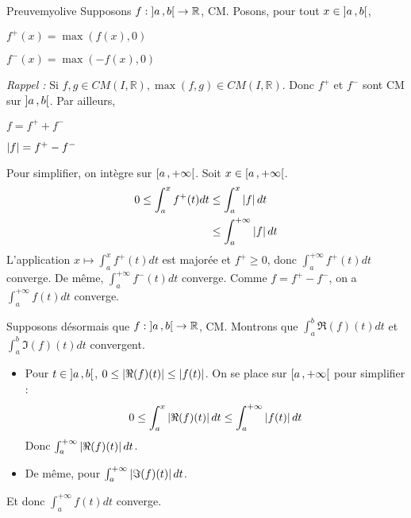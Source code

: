     \begin{demo}{Preuve}{myolive}
        Supposons $f : \left] a \, , b \right[ \to \mathbb{R}$, CM. Posons, pour tout $x \in \left] a \, , b \right[$, 
        \begin{itemize}
            \begin{multicols}{2}
            \item $f^+(x) = \max\left(f(x),0\right)$
            \item $f^-(x) = \max\left(-f(x),0\right)$                
            \end{multicols}
        \end{itemize}
        \textcolor{myolive}{\textit{Rappel :}} Si $f, g \in CM(I,\mathbb{R}), \max(f,g) \in CM(I,\mathbb{R})$. Donc $f^+$ et $f^-$ sont CM sur $\left] a \, , b \right[$. Par ailleurs,
        \begin{itemize}
            \begin{multicols}{2}
                \item $f = f^+ + f^-$
                \item $\left\lvert f\right\rvert = f^+ - f^-$
            \end{multicols}
        \end{itemize}
        Pour simplifier, on intègre sur $\left[ a \, , +\infty \right[$. Soit $x \in \left[ a \, , +\infty \right[$.
        \begin{align*}
            0 \leq \int_{a}^{x} f^+(t)dt 
            &\leq \int_{a}^{x} \left\lvert f\right\rvert dt \\
            &\leq \int_{a}^{+\infty} \left\lvert f\right\rvert dt 
        \end{align*}
        L’application $x \mapsto \int_{a}^{x} f^+(t)dt$ est majorée et $f^+ \geq 0$, donc $\int_{a}^{+\infty} f^+(t)dt$ converge. De même, $\int_{a}^{+\infty} f^-(t)dt$ converge. Comme $f = f^+ - f^-$, on a $\int_{a}^{+\infty} f(t)dt$ converge.

        Supposons désormais que $f : \left] a \, , b \right[ \to \mathbb{R}$, CM. Montrons que $\int_{a}^{b} \Re(f)(t)dt$ et $\int_{a}^{b} \Im(f)(t)dt$ convergent.
        \begin{itemize}
            \item Pour $t \in \left] a \, , b \right[$, $0 \leq \left\lvert \Re(f)(t)\right\rvert \leq \left\lvert f(t)\right\rvert$. On se place sur $\left[ a \, , +\infty \right[$ pour simplifier :
            \[ 0 \leq \int_{a}^{x} \left\lvert \Re(f)(t)\right\rvert dt \leq \int_{a}^{+\infty} \left\lvert f(t)\right\rvert dt \]   
            Donc $\int_{a}^{+\infty} \left\lvert \Re(f)(t)\right\rvert dt$. 
            \item De même, pour $\int_{a}^{+\infty} \left\lvert \Im(f)(t)\right\rvert dt$. 
        \end{itemize}
        Et donc $\int_{a}^{+\infty} f(t)dt$ converge.
    \end{demo}


